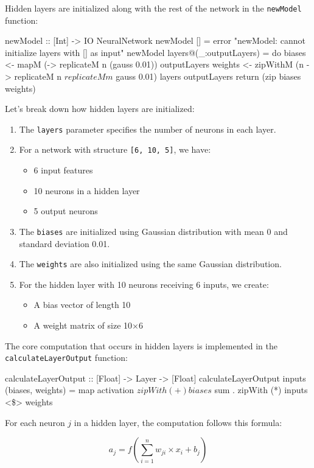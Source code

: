 \documentclass[12pt,a4paper]{article}
\begin{document}
Hidden layers are initialized along with the rest of the network in the \texttt{newModel} function:
\begin{code}
newModel :: [Int] -> IO NeuralNetwork
newModel [] = error "newModel: cannot initialize layers with [] as input"
newModel layers@(_:outputLayers) = do
biases <- mapM (\n -> replicateM n (gauss 0.01)) outputLayers
weights <- zipWithM (\m n -> replicateM n $ replicateM m $ gauss 0.01) layers outputLayers
return (zip biases weights)
\end{code}
Let's break down how hidden layers are initialized:
\begin{enumerate}
    \item The \texttt{layers} parameter specifies the number of neurons in each layer.
    \item For a network with structure \texttt{[6, 10, 5]}, we have:
        \begin{itemize}
            \item 6 input features
            \item 10 neurons in a hidden layer
            \item 5 output neurons
        \end{itemize}
    \item The \texttt{biases} are initialized using Gaussian distribution with mean 0 and standard deviation 0.01.
    \item The \texttt{weights} are also initialized using the same Gaussian distribution.
    \item For the hidden layer with 10 neurons receiving 6 inputs, we create:
        \begin{itemize}
            \item A bias vector of length 10
            \item A weight matrix of size 10×6 \end{itemize}
\end{enumerate}

The core computation that occurs in hidden layers is implemented in the \texttt{calculateLayerOutput} function:
\begin{code}
calculateLayerOutput :: [Float] -> Layer -> [Float]
calculateLayerOutput inputs (biases, weights) =
map activation $ zipWith (+) biases $ sum . zipWith (*) inputs <\$> weights
\end{code}

For each neuron $j$ in a hidden layer, the computation follows this formula:

$$a_j = f\left(\sum_{i=1}^{n} w_{ji} \times x_i + b_j\right)$$
\end{document}
